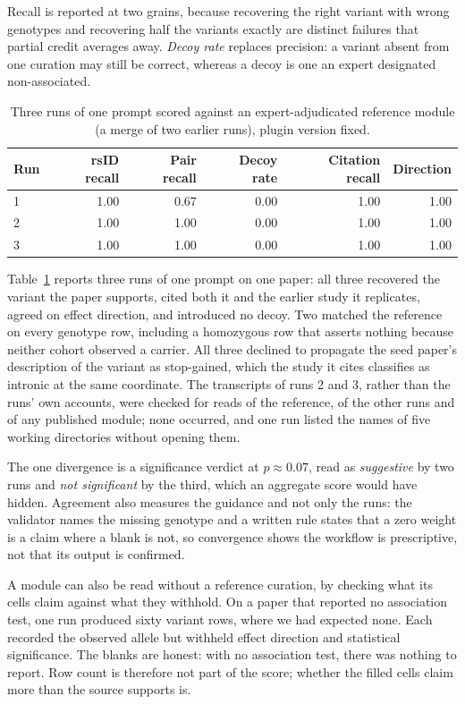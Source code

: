 \documentclass[11pt,a4paper]{article}
\begin{document}
Recall is reported at two
grains, because recovering the right variant with wrong genotypes and
recovering half the variants exactly are distinct failures that partial
credit averages away. \emph{Decoy rate} replaces precision: a variant
absent from one curation may still be correct, whereas a decoy is one an
expert designated non-associated.

\begin{table}[ht]
\centering
\small
\caption{Three runs of one prompt scored against an expert-adjudicated
reference module (a merge of two earlier runs), plugin version fixed.}
\label{tab:scores}
\begin{tabular}{@{}lrrrrr@{}}
\toprule
Run & rsID recall & Pair recall & Decoy rate & Citation recall & Direction \\
\midrule
1 & 1.00 & 0.67 & 0.00 & 1.00 & 1.00 \\
2 & 1.00 & 1.00 & 0.00 & 1.00 & 1.00 \\
3 & 1.00 & 1.00 & 0.00 & 1.00 & 1.00 \\
\bottomrule
\end{tabular}
\end{table}

Table~\ref{tab:scores} reports three runs of one prompt on one paper: all
three recovered the variant the paper supports, cited both it and the
earlier study it replicates, agreed on effect direction, and introduced no
decoy. Two matched the reference on every genotype row, including a
homozygous row that asserts nothing because neither cohort observed a
carrier. All three declined to propagate the seed paper's description of
the variant as stop-gained, which the study it cites classifies as intronic
at the same coordinate.
The transcripts of runs 2 and 3, rather than the runs' own accounts, were
checked for reads of the reference, of the other runs and of any published
module; none occurred, and one run listed the names of five working
directories without opening them.

The one divergence is a significance verdict at $p \approx 0.07$, read as
\emph{suggestive} by two runs and \emph{not significant} by the third, which
an aggregate score would have hidden. Agreement also measures the guidance and not only the runs: the
validator names the missing genotype and a written rule states that a zero
weight is a claim where a blank is not, so convergence shows the workflow
is prescriptive, not that its output is confirmed.

A module can also be read without a reference curation, by checking what its
cells claim against what they withhold. On a paper that
reported no association test, one run produced sixty variant rows, where we
had expected none. Each recorded
the observed allele but withheld effect direction and statistical
significance. The blanks are honest: with no association test, there was
nothing to report. Row count is therefore not part of the score; whether the
filled cells claim more than the source supports is.
\end{document}
